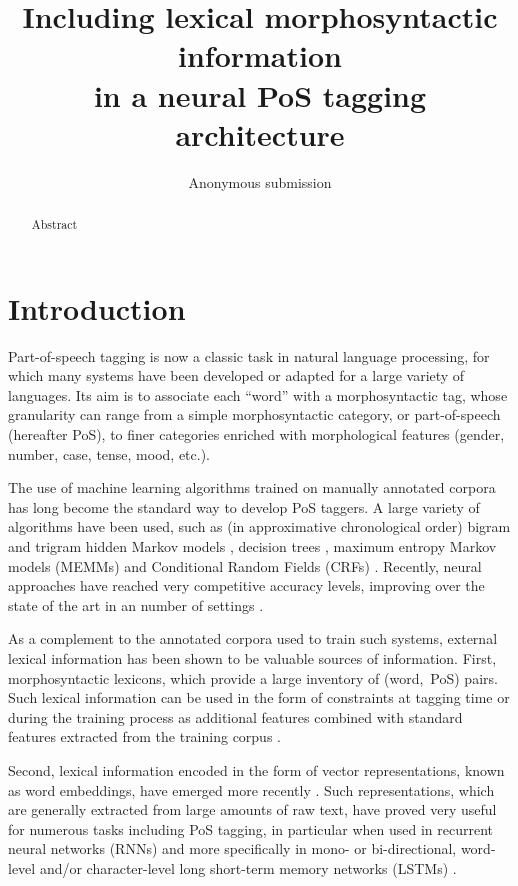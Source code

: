 \documentclass[11pt,letterpaper]{article}
\title{Including lexical morphosyntactic information\\in a neural PoS tagging architecture}
\author{Anonymous submission}
\date{}
\begin{document}
\maketitle

\begin{abstract}
  Abstract
\end{abstract}


\section{Introduction}

Part-of-speech tagging is now a classic task in natural language processing, for which many systems have been developed
or adapted for a large variety of languages. Its aim is to associate each ``word'' with a morphosyntactic tag, whose
granularity can range from a simple morphosyntactic category, or part-of-speech (hereafter PoS), to finer categories
enriched with morphological features (gender, number, case, tense, mood, etc.).

The use of machine learning algorithms trained on manually annotated corpora has long become the standard way to develop
PoS taggers. A large variety of algorithms have been used, such as (in approximative chronological order) bigram and
trigram hidden Markov models \cite{merialdo94,brants96,brants00}, decision trees \cite{schmid94,magerman95}, maximum
entropy Markov models (MEMMs) \cite{ratnaparkhi96} and Conditional Random Fields (CRFs)
\cite{lafferty01,constant12}. Recently, neural approaches have reached very competitive accuracy levels, improving over
the state of the art in an number of settings \cite{plank16}.

As a complement to the annotated corpora used to train such systems, external lexical information has been shown to be
valuable sources of information. First, morphosyntactic lexicons, which provide a large inventory of (word,~PoS)
pairs. Such lexical information can be used in the form of constraints at tagging time \cite{kim99,hajic00tagging} or
during the training process as additional features combined with standard features extracted from the training corpus
\cite{chrupala08,goldberg09,denis12}.

Second, lexical information encoded in the form of vector representations, known as word embeddings, have
emerged more recently \cite{bengio03,collobert08,chrupala13,ling15,ballesteros15,muller15}. Such representations, which
are generally extracted from large amounts of raw text, have proved very useful for numerous tasks including PoS
tagging, in particular when used in recurrent neural networks (RNNs) and more specifically in mono- or bi-directional,
word-level and/or character-level long short-term memory networks (LSTMs)
\cite{hochreiter97,ling15,ballesteros15,plank16}.
\end{document}
